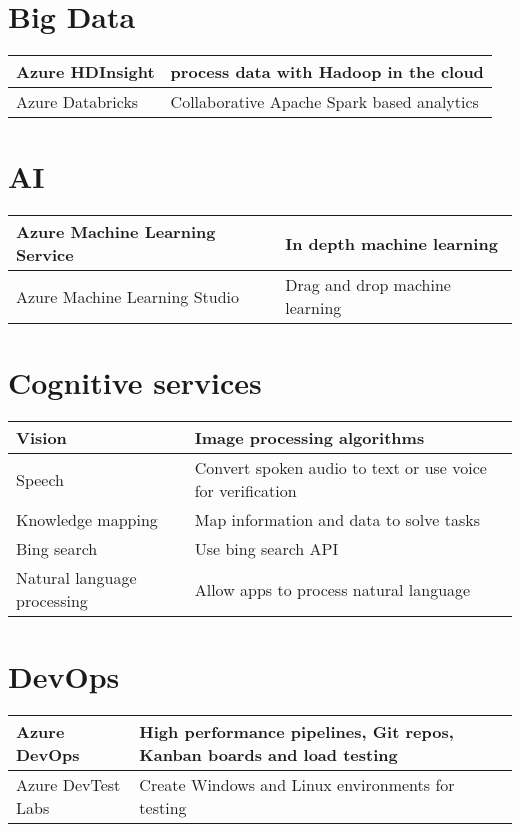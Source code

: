 \documentclass{article}[18pt]
\begin{document}
\section{Big Data}
{\renewcommand{\arraystretch}{2}
	\begin{tabularx}{\textwidth}{X X}
		
		Azure HDInsight & process data with Hadoop in the cloud\\
		\hline
		Azure Databricks& Collaborative Apache Spark based analytics
		
		
		
	\end{tabularx}
}

\section{AI}
{\renewcommand{\arraystretch}{2}
	\begin{tabularx}{\textwidth}{X X}
		
		Azure Machine Learning Service& In depth machine learning\\
		\hline
		Azure Machine Learning Studio& Drag and drop machine learning
		
		
	\end{tabularx}
}
\section{Cognitive services}
{\renewcommand{\arraystretch}{2}
	\begin{tabularx}{\textwidth}{X X}
		
		Vision& Image processing algorithms\\
		\hline
		Speech& Convert spoken audio to text or use voice for verification\\
		\hline
		Knowledge mapping & Map information and data to solve tasks\\
		\hline
		Bing search& Use bing search API\\
		\hline
		Natural language processing & Allow apps to process natural language
		
		
		
	\end{tabularx}
}

\section{DevOps}
{\renewcommand{\arraystretch}{2}
	\begin{tabularx}{\textwidth}{X X}
		
		Azure DevOps& High performance pipelines, Git repos, Kanban boards and load testing\\
		\hline
		Azure DevTest Labs& Create Windows and Linux environments for testing
		
		
		
	\end{tabularx}
}
\end{document}
